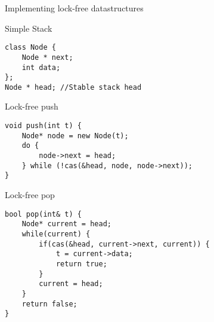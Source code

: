 \begin{frame}{Implementing lock-free datastructures}
\begin{block}{Simple Stack}
\begin{lstlisting}[style=customc]
class Node {
    Node * next;
    int data;
};
Node * head; //Stable stack head
\end{lstlisting}
\end{block} 

\begin{block}{Lock-free push}
\begin{lstlisting}[style=customc]
void push(int t) {
    Node* node = new Node(t);
    do {
        node->next = head;
    } while (!cas(&head, node, node->next));
}
\end{lstlisting}
\end{block}

\begin{block}{Lock-free pop}
\begin{lstlisting}[style=customc]
bool pop(int& t) {
    Node* current = head;
    while(current) {
        if(cas(&head, current->next, current)) {
            t = current->data;
            return true;
        }
        current = head;
    }
    return false;
}
\end{lstlisting}
\end{block}

\end{frame}

